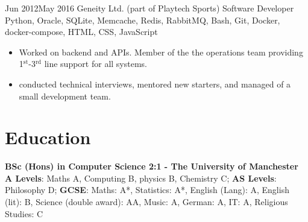 \documentclass[10pt]{article} %
\begin{document}
\jobheader
{Jun 2012}{May 2016}
{Geneity Ltd. (part of Playtech Sports)}
{Software Developer}
{
      Python,
      Oracle, SQLite,
      Memcache, Redis,
      RabbitMQ,
      Bash,
      Git,
      Docker, docker-compose,
      HTML, CSS, JavaScript
}
{
      \begin{itemize}

      \item Worked on backend and APIs. Member of the the operations team providing
            1$^{\textrm{st}}$-3$^{\textrm{rd}}$ line support for all systems.

      \item conducted technical interviews, mentored new starters, and managed of a small
            development team.

      \end{itemize}
}


\section{Education}

\textbf{BSc (Hons) in Computer Science 2:1 - The University of Manchester}
\\
\textbf{A Levels}: Maths A, Computing B, physics B, Chemistry C;
\textbf{AS Levels}: Philosophy D;
\textbf{GCSE}:
   Maths: A*,
   Statistics: A*,
   English (Lang): A,
   English (lit): B,
   Science (double award): AA,
   Music: A,
   German: A,
   IT: A,
   Religious Studies: C



\end{document}
